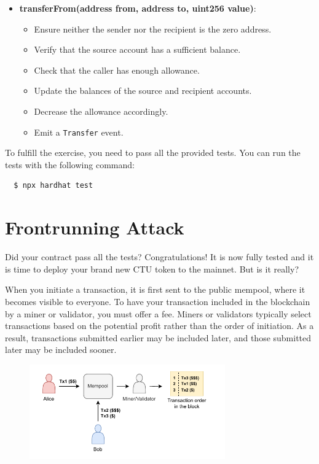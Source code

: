 \documentclass[12pt]{article}
\begin{document}
\begin{itemize}
    \item \textbf{transferFrom(address from, address to, uint256 value)}:
    \begin{itemize}
        \item Ensure neither the sender nor the recipient is the zero address.
        \item Verify that the source account has a sufficient balance.
        \item Check that the caller has enough allowance.
        \item Update the balances of the source and recipient accounts.
        \item Decrease the allowance accordingly.
        \item Emit a \texttt{Transfer} event.
    \end{itemize}
\end{itemize}

To fulfill the exercise, you need to pass all the provided tests. You can run the tests with the following command:
\begin{verbatim}
  $ npx hardhat test
\end{verbatim}

\section{Frontrunning Attack}

Did your contract pass all the tests? Congratulations! It is now fully tested and it is time to deploy your brand new CTU token to the mainnet. But is it really?

When you initiate a transaction, it is first sent to the public mempool, where it becomes visible to everyone. To have your transaction included in the blockchain by a miner or validator, you must offer a fee. Miners or validators typically select transactions based on the potential profit rather than the order of initiation. As a result, transactions submitted earlier may be included later, and those submitted later may be included sooner.

\begin{figure}[H]
\centering
\includegraphics[width=0.75\textwidth]{sandwich.pdf}
\label{fig:frontrunning}
\end{figure}
\end{document}
